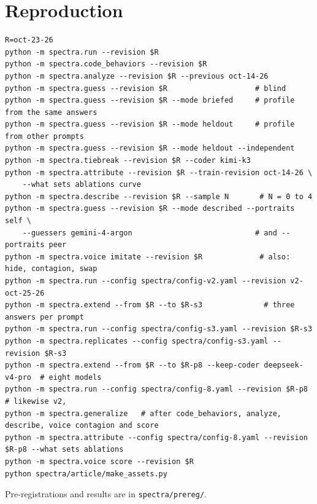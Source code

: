 \documentclass[11pt]{article}
\begin{document}
\section{Reproduction}
{\footnotesize
\begin{verbatim}
R=oct-23-26
python -m spectra.run --revision $R
python -m spectra.code_behaviors --revision $R
python -m spectra.analyze --revision $R --previous oct-14-26
python -m spectra.guess --revision $R                    # blind
python -m spectra.guess --revision $R --mode briefed     # profile from the same answers
python -m spectra.guess --revision $R --mode heldout     # profile from other prompts
python -m spectra.guess --revision $R --mode heldout --independent
python -m spectra.tiebreak --revision $R --coder kimi-k3
python -m spectra.attribute --revision $R --train-revision oct-14-26 \
    --what sets ablations curve
python -m spectra.describe --revision $R --sample N       # N = 0 to 4
python -m spectra.guess --revision $R --mode described --portraits self \
    --guessers gemini-4-argon                            # and --portraits peer
python -m spectra.voice imitate --revision $R             # also: hide, contagion, swap
python -m spectra.run --config spectra/config-v2.yaml --revision v2-oct-25-26
python -m spectra.extend --from $R --to $R-s3              # three answers per prompt
python -m spectra.run --config spectra/config-s3.yaml --revision $R-s3
python -m spectra.replicates --config spectra/config-s3.yaml --revision $R-s3
python -m spectra.extend --from $R --to $R-p8 --keep-coder deepseek-v4-pro  # eight models
python -m spectra.run --config spectra/config-8.yaml --revision $R-p8      # likewise v2,
python -m spectra.generalize   # after code_behaviors, analyze, describe, voice contagion and score
python -m spectra.attribute --config spectra/config-8.yaml --revision $R-p8 --what sets ablations
python -m spectra.voice score --revision $R
python spectra/article/make_assets.py
\end{verbatim}
}
Pre-registrations and results are in \texttt{spectra/prereg/}.
\end{document}
